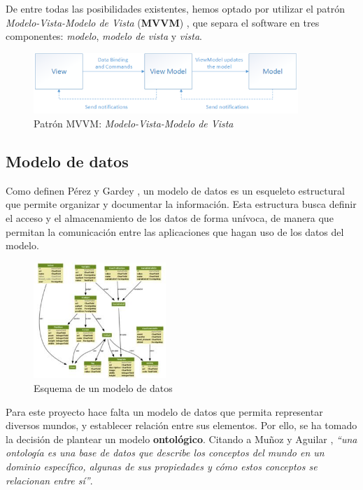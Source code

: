 De entre todas las posibilidades existentes, hemos optado por utilizar el patrón \textit{Modelo-Vista-Modelo de Vista} (\textbf{MVVM})
\autocite*{MicrosoftMVVM}, que separa el software en tres componentes: \textit{modelo}, \textit{modelo de vista} y \textit{vista}.\medskip

\begin{figure}[H]
    \centering
    \includegraphics[width=10cm]{Images/mvvm.png}
    \caption{Patrón MVVM: \textit{Modelo-Vista-Modelo de Vista} \autocite*{MicrosoftMVVM}}
\end{figure}

\subsection{Modelo de datos} \label{Modelo_Datos}
Como definen Pérez y Gardey \autocite*{Perez2017}, un modelo de datos es un esqueleto estructural que permite organizar 
y documentar la información. Esta estructura busca definir el acceso y el almacenamiento de los datos de forma 
unívoca, de manera que permitan la comunicación entre las aplicaciones que hagan uso de los datos del modelo.  \medskip

\begin{figure}[H]
    \centering
    \includegraphics[width=5cm]{Figures/modelo_datos.jpg}
    \caption{Esquema de un modelo de datos \autocite*{Perez2017}}
\end{figure}

Para este proyecto hace falta un modelo de datos que permita representar diversos mundos, y establecer relación entre sus elementos.
Por ello, se ha tomado la decisión de plantear un modelo \textbf{ontológico}. Citando a Muñoz y Aguilar \autocite*{Munoz2009}, 
\textit{“una ontología es una base de datos que describe los conceptos del mundo en un dominio específico, algunas de sus 
propiedades y cómo estos conceptos se relacionan entre sí”}. \autocite*{Munoz2009}
 
